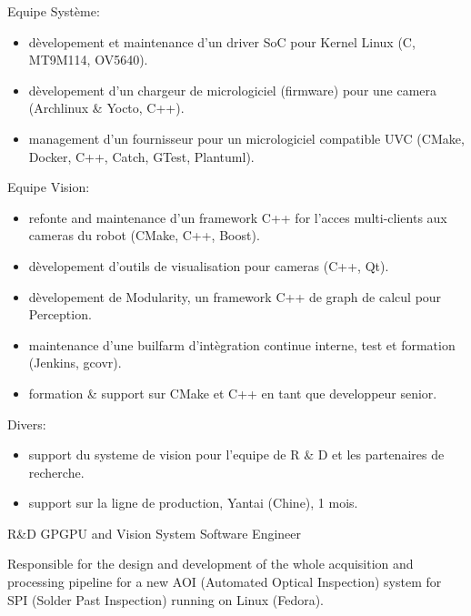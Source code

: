 \documentclass{article}
\begin{document}
\begin{llist}
{Equipe Syst\`{e}me:
\vspace{-0.33cm}
\begin{itemize}
\item d\`{e}velopement et maintenance d'un driver SoC pour Kernel Linux (C, MT9M114, OV5640).
\item d\`{e}velopement d'un chargeur de micrologiciel (firmware) pour une camera (Archlinux \& Yocto, C++).
\item management d'un fournisseur pour un micrologiciel compatible UVC (CMake, Docker, C++, Catch, GTest, Plantuml).
\end{itemize}
Equipe Vision:
\vspace{-0.33cm}
\begin{itemize}
\item refonte and maintenance d'un framework C++ for l'acces multi-clients aux cameras du robot (CMake, C++, Boost).
\item d\`{e}velopement d'outils de visualisation pour cameras (C++, Qt).
\item d\`{e}velopement de Modularity, un framework C++ de graph de calcul pour Perception.
\item maintenance d'une builfarm d'int\`{e}gration continue interne, test et formation (Jenkins, gcovr).
\item formation \& support sur CMake et C++ en tant que developpeur senior.
\end{itemize}
Divers:
\vspace{-0.33cm}
\begin{itemize}
\item support du systeme de vision pour l'equipe de R \& D et les partenaires de recherche.
\item support sur la ligne de production, Yantai (Chine), 1 mois.
\end{itemize}
}

 {
R\&D GPGPU and Vision System Software Engineer\\
\vspace{-0.33cm}

Responsible for the design and development of the whole acquisition and processing pipeline
for a new AOI (Automated Optical Inspection) system for SPI (Solder Past Inspection)
 running on Linux (Fedora).

}
\end{llist}
\end{document}
